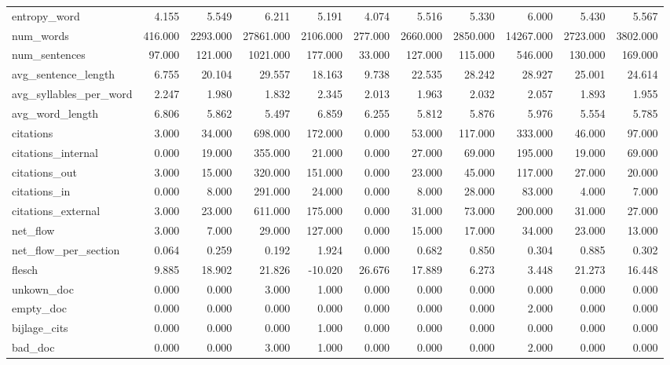 \begin{tabular}{lrrrrrrrrrr}
\cline{1-11}
entropy\_word & 4.155 & 5.549 & 6.211 & 5.191 & 4.074 & 5.516 & 5.330 & 6.000 & 5.430 & 5.567 \\
\cline{1-11}
num\_words & 416.000 & 2293.000 & 27861.000 & 2106.000 & 277.000 & 2660.000 & 2850.000 & 14267.000 & 2723.000 & 3802.000 \\
\cline{1-11}
num\_sentences & 97.000 & 121.000 & 1021.000 & 177.000 & 33.000 & 127.000 & 115.000 & 546.000 & 130.000 & 169.000 \\
\cline{1-11}
avg\_sentence\_length & 6.755 & 20.104 & 29.557 & 18.163 & 9.738 & 22.535 & 28.242 & 28.927 & 25.001 & 24.614 \\
\cline{1-11}
avg\_syllables\_per\_word & 2.247 & 1.980 & 1.832 & 2.345 & 2.013 & 1.963 & 2.032 & 2.057 & 1.893 & 1.955 \\
\cline{1-11}
avg\_word\_length & 6.806 & 5.862 & 5.497 & 6.859 & 6.255 & 5.812 & 5.876 & 5.976 & 5.554 & 5.785 \\
\cline{1-11}
citations & 3.000 & 34.000 & 698.000 & 172.000 & 0.000 & 53.000 & 117.000 & 333.000 & 46.000 & 97.000 \\
\cline{1-11}
citations\_internal & 0.000 & 19.000 & 355.000 & 21.000 & 0.000 & 27.000 & 69.000 & 195.000 & 19.000 & 69.000 \\
\cline{1-11}
citations\_out & 3.000 & 15.000 & 320.000 & 151.000 & 0.000 & 23.000 & 45.000 & 117.000 & 27.000 & 20.000 \\
\cline{1-11}
citations\_in & 0.000 & 8.000 & 291.000 & 24.000 & 0.000 & 8.000 & 28.000 & 83.000 & 4.000 & 7.000 \\
\cline{1-11}
citations\_external & 3.000 & 23.000 & 611.000 & 175.000 & 0.000 & 31.000 & 73.000 & 200.000 & 31.000 & 27.000 \\
\cline{1-11}
net\_flow & 3.000 & 7.000 & 29.000 & 127.000 & 0.000 & 15.000 & 17.000 & 34.000 & 23.000 & 13.000 \\
\cline{1-11}
net\_flow\_per\_section & 0.064 & 0.259 & 0.192 & 1.924 & 0.000 & 0.682 & 0.850 & 0.304 & 0.885 & 0.302 \\
\cline{1-11}
flesch & 9.885 & 18.902 & 21.826 & -10.020 & 26.676 & 17.889 & 6.273 & 3.448 & 21.273 & 16.448 \\
\cline{1-11}
unkown\_doc & 0.000 & 0.000 & 3.000 & 1.000 & 0.000 & 0.000 & 0.000 & 0.000 & 0.000 & 0.000 \\
\cline{1-11}
empty\_doc & 0.000 & 0.000 & 0.000 & 0.000 & 0.000 & 0.000 & 0.000 & 2.000 & 0.000 & 0.000 \\
\cline{1-11}
bijlage\_cits & 0.000 & 0.000 & 0.000 & 1.000 & 0.000 & 0.000 & 0.000 & 0.000 & 0.000 & 0.000 \\
\cline{1-11}
bad\_doc & 0.000 & 0.000 & 3.000 & 1.000 & 0.000 & 0.000 & 0.000 & 2.000 & 0.000 & 0.000 \\
\cline{1-11}
\bottomrule
\end{tabular}
